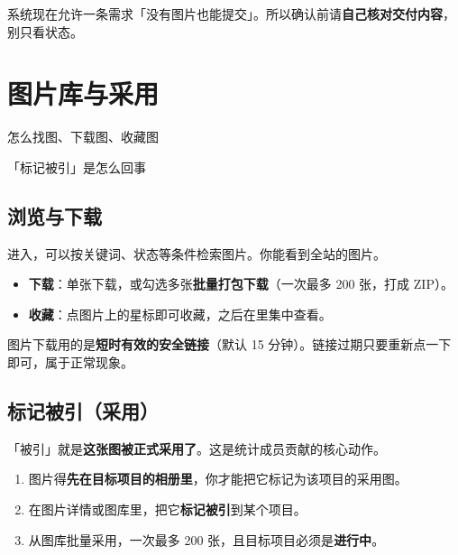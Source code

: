 \documentclass[cn,11pt,green]{elegantbook}
\begin{document}
\begin{notebox}[允许零图片交付]
  系统现在允许一条需求「没有图片也能提交」。所以确认前请\textbf{自己核对交付内容}，别只看状态。
\end{notebox}

\chapter{图片库与采用}

\begin{introduction}
  \item 怎么找图、下载图、收藏图
  \item 「标记被引」是怎么回事
\end{introduction}

\section{浏览与下载}

进入，可以按关键词、状态等条件检索图片。你能看到全站的图片。

\begin{itemize}
  \item \textbf{下载}：单张下载，或勾选多张\textbf{批量打包下载}（一次最多 200 张，打成 ZIP）。
  \item \textbf{收藏}：点图片上的星标即可收藏，之后在里集中查看。
\end{itemize}

\begin{tipbox}[下载链接是临时的]
  图片下载用的是\textbf{短时有效的安全链接}（默认 15 分钟）。链接过期只要重新点一下即可，属于正常现象。
\end{tipbox}

\section{标记被引（采用）}

「被引」就是\textbf{这张图被正式采用了}。这是统计成员贡献的核心动作。

\begin{stepbox}[采用一张图]
  \begin{enumerate}
    \item 图片得\textbf{先在目标项目的相册里}，你才能把它标记为该项目的采用图。
    \item 在图片详情或图库里，把它\textbf{标记被引}到某个项目。
    \item 从图库批量采用，一次最多 200 张，且目标项目必须是\textbf{进行中}。
  \end{enumerate}
\end{stepbox}
\end{document}
